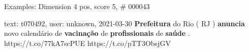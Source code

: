 \begin{frame}{Examples: Dimension 4 pos, score 5, \# 000043}
\footnotesize
\begin{exampleblock}{text: t070492, user: unknown, 2021-03-30}
\textbf{Prefeitura} do Rio ( RJ ) \textbf{anuncia} novo calendário de 
\textbf{vacinação} de \textbf{profissionais} de \textbf{saúde} . 
https://t.co/77kA7scPUE https://t.co/pTT3ObsjGV 
\end{exampleblock}
\end{frame}
